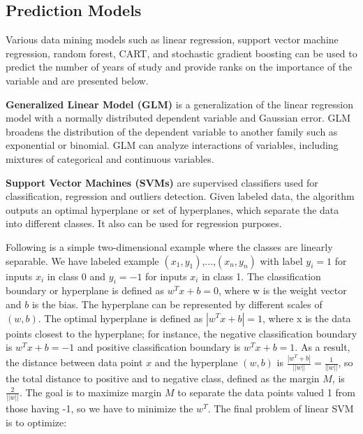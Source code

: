 \documentclass[12pt,english]{report}
\begin{document}
\subsection{Prediction Models}
Various data mining models such as linear regression, support vector machine regression, random forest, CART, and stochastic gradient boosting can be used to predict the number of years of study and provide ranks on the importance of the variable and are presented below.

\vspace{0.15in}
\noindent \textbf{Generalized Linear Model (GLM)} is a generalization of the linear regression model with a normally distributed dependent variable and Gaussian error. GLM broadens the distribution of the dependent variable to another family such as exponential or binomial. GLM can analyze interactions of variables, including mixtures of categorical and continuous variables.

\vspace{0.15in}
\noindent \textbf{Support Vector Machines (SVMs)} are supervised classifiers used for classification, regression and outliers detection. Given labeled data, the algorithm outputs an optimal hyperplane or set of hyperplanes, which separate the data into different classes. It also can be used for regression purposes.

Following is a simple two-dimensional example where the classes are linearly separable.  We have labeled example $(x_1,y_1)$,...,$(x_n, y_n)$ with label $y_i = 1$ for inputs $x_i$ in class 0 and $y_i = -1$ for inputs $x_i$ in class 1. The classification boundary or hyperplane is defined as $w^T x +b = 0$, where w is the weight vector and $b$ is the bias. The hyperplane can be represented by different scales of $(w,b)$. The optimal hyperplane is defined as $|w^T x +b | = 1$, where x is the data points closest to the hyperplane; for instance, the negative classification boundary is $w^T x +b = -1$ and positive classification boundary is $w^T x +b  = 1$. As a result, the distance between data point $x$ and the hyperplane $(w,b)$ is $ \frac{|w^T+b|}{||w||}= \frac{1}{||w||}$, so the total distance to positive and to negative class, defined as the margin $M$, is $\frac{2}{||w||}$.  The goal is to maximize margin $M$ to separate the data points valued 1 from those having -1, so we have to minimize the $w^T$. The final problem of linear SVM is to optimize:
\end{document}
